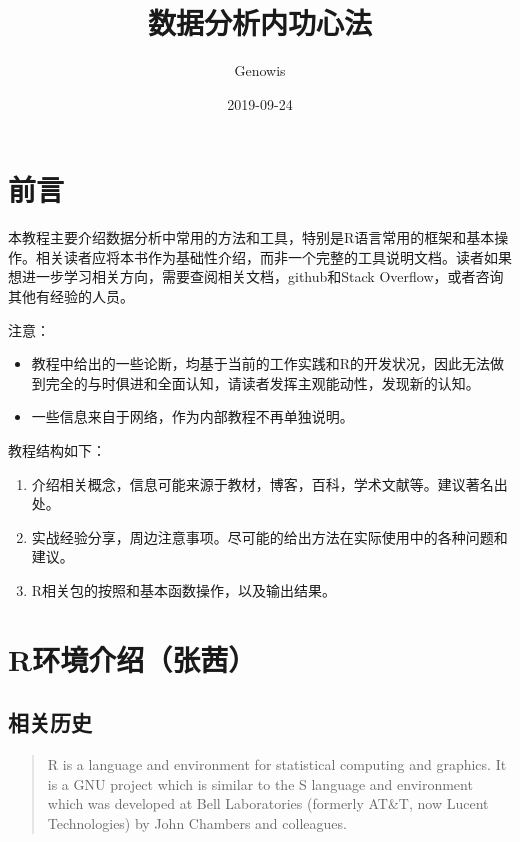 \documentclass[]{book}
\title{数据分析内功心法}
\author{Genowis}
\date{2019-09-24}
\providecommand{\tightlist}{%
  \setlength{\itemsep}{0pt}\setlength{\parskip}{0pt}}
\begin{document}
\maketitle

{
\setcounter{tocdepth}{1}
\tableofcontents
}
\hypertarget{section}{%
\chapter{前言}\label{section}}

本教程主要介绍数据分析中常用的方法和工具，特别是R语言常用的框架和基本操作。相关读者应将本书作为基础性介绍，而非一个完整的工具说明文档。读者如果想进一步学习相关方向，需要查阅相关文档，github和Stack Overflow，或者咨询其他有经验的人员。

注意：

\begin{itemize}
\tightlist
\item
  教程中给出的一些论断，均基于当前的工作实践和R的开发状况，因此无法做到完全的与时俱进和全面认知，请读者发挥主观能动性，发现新的认知。
\item
  一些信息来自于网络，作为内部教程不再单独说明。
\end{itemize}

教程结构如下：

\begin{enumerate}
\def\labelenumi{\arabic{enumi}.}
\tightlist
\item
  介绍相关概念，信息可能来源于教材，博客，百科，学术文献等。建议著名出处。
\item
  实战经验分享，周边注意事项。尽可能的给出方法在实际使用中的各种问题和建议。
\item
  R相关包的按照和基本函数操作，以及输出结果。
\end{enumerate}

\hypertarget{intro}{%
\chapter{R环境介绍（张茜）}\label{intro}}

\hypertarget{section-1}{%
\section{相关历史}\label{section-1}}

\begin{quote}
R is a language and environment for statistical computing and graphics. It is a GNU project which is similar to the S language and environment which was developed at Bell Laboratories (formerly AT\&T, now Lucent Technologies) by John Chambers and colleagues.
\end{quote}
\end{document}
